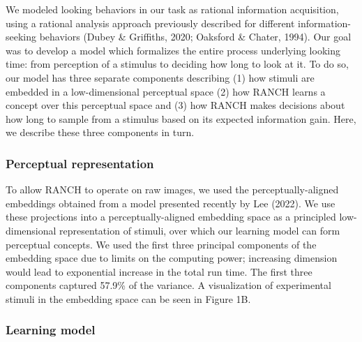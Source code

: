 \documentclass[10pt, letterpaper]{article}
\begin{document}
We modeled looking behaviors in our task as rational information
acquisition, using a rational analysis approach previously described for
different information-seeking behaviors (Dubey \& Griffiths, 2020;
Oaksford \& Chater, 1994). Our goal was to develop a model which
formalizes the entire process underlying looking time: from perception
of a stimulus to deciding how long to look at it. To do so, our model
has three separate components describing (1) how stimuli are embedded in
a low-dimensional perceptual space (2) how RANCH learns a concept over
this perceptual space and (3) how RANCH makes decisions about how long
to sample from a stimulus based on its expected information gain. Here,
we describe these three components in turn.

\hypertarget{perceptual-representation}{%
\subsubsection{Perceptual
representation}\label{perceptual-representation}}

To allow RANCH to operate on raw images, we used the
perceptually-aligned embeddings obtained from a model presented recently
by Lee (2022). We use these projections into a perceptually-aligned
embedding space as a principled low-dimensional representation of
stimuli, over which our learning model can form perceptual concepts. We
used the first three principal components of the embedding space due to
limits on the computing power; increasing dimension would lead to
exponential increase in the total run time. The first three components
captured 57.9\% of the variance. A visualization of experimental stimuli
in the embedding space can be seen in Figure 1B.

\hypertarget{learning-model}{%
\subsubsection{Learning model}\label{learning-model}}
\end{document}
